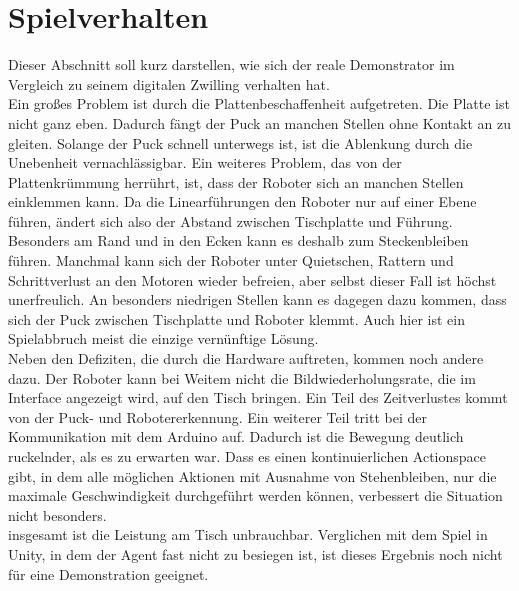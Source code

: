 \section{Spielverhalten}
\label{sect:verh}
Dieser Abschnitt soll kurz darstellen, wie sich der reale Demonstrator im Vergleich zu seinem digitalen Zwilling verhalten hat.\\
Ein großes Problem ist durch die Plattenbeschaffenheit aufgetreten. Die Platte ist nicht ganz eben. Dadurch fängt der Puck an manchen Stellen ohne Kontakt an zu gleiten. Solange der Puck schnell unterwegs ist, ist die Ablenkung durch die Unebenheit vernachlässigbar. Ein weiteres Problem, das von der Plattenkrümmung herrührt, ist, dass der Roboter sich an manchen Stellen einklemmen kann. Da die Linearführungen den Roboter nur auf einer Ebene führen, ändert sich also der Abstand zwischen Tischplatte und Führung. Besonders am Rand und in den Ecken kann es deshalb zum Steckenbleiben führen. Manchmal kann sich der Roboter unter Quietschen, Rattern und Schrittverlust an den Motoren wieder befreien, aber selbst dieser Fall ist höchst unerfreulich. An besonders niedrigen Stellen kann es dagegen dazu kommen, dass sich der Puck zwischen Tischplatte und Roboter klemmt. Auch hier ist ein Spielabbruch meist die einzige vernünftige Lösung.\\
Neben den Defiziten, die durch die Hardware auftreten, kommen noch andere dazu. Der Roboter kann bei Weitem nicht die Bildwiederholungsrate, die im Interface angezeigt wird, auf den Tisch bringen. Ein Teil des Zeitverlustes kommt von der Puck- und Robotererkennung. Ein weiterer Teil tritt bei der Kommunikation mit dem Arduino auf. Dadurch ist die Bewegung deutlich ruckelnder, als es zu erwarten war. Dass es einen kontinuierlichen Actionspace gibt, in dem alle möglichen Aktionen mit Ausnahme von Stehenbleiben, nur die maximale Geschwindigkeit durchgeführt werden können, verbessert die Situation nicht besonders.\\
insgesamt ist die Leistung am Tisch unbrauchbar. Verglichen mit dem Spiel in Unity, in dem der Agent fast nicht zu besiegen ist, ist dieses Ergebnis noch nicht für eine Demonstration geeignet.